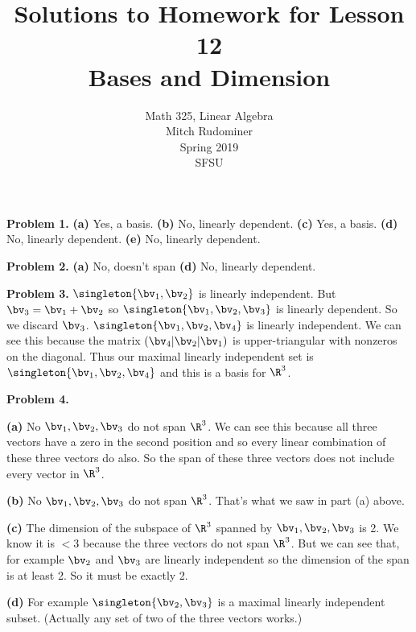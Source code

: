 \documentclass[oneside,12pt]{amsart}
\begin{document}
\title{Solutions to Homework for Lesson 12 \\ Bases and Dimension}
\author{Math 325, Linear Algebra \\ Mitch Rudominer \\ Spring 2019 \\ SFSU }
\date{}

\maketitle


\textbf{Problem 1.}
\textbf{(a)} Yes, a basis.
\textbf{(b)} No, linearly dependent.
\textbf{(c)} Yes, a basis.
\textbf{(d)} No, linearly dependent.
\textbf{(e)} No, linearly dependent.
\bigskip

\textbf{Problem 2.}
\textbf{(a)} No, doesn't span
\textbf{(d)} No, linearly dependent.

\bigskip


\textbf{Problem 3.} $\singleton{\bv_1,\bv_2}$ is linearly independent.
But $\bv_3 = \bv_1+\bv_2$ so $\singleton{\bv_1,\bv_2,\bv_3}$ is linearly
dependent. So we discard $\bv_3$. $\singleton{\bv_1,\bv_2,\bv_4}$ is linearly
independent. We can see this because the matrix
$\left(\bv_4 \vert \bv_2 \vert \bv_1 \right)$ is upper-triangular with
nonzeros on the diagonal. Thus our maximal linearly independent set is
$\singleton{\bv_1,\bv_2,\bv_4}$ and this is a basis for $\R^3$.

\bigskip

\textbf{Problem 4.}

\textbf{(a)} No $\bv_1,\bv_2,\bv_3$ do not span $\R^3$. We can see this because
all three vectors have a zero in the second position and so every linear combination
of these three vectors do also. So the span of these three vectors does not include
every vector in $\R^3$.

\bigskip



\textbf{(b)} No $\bv_1,\bv_2,\bv_3$ do not span $\R^3$. That's what we saw in part (a) above.

\bigskip


\textbf{(c)} The dimension of the subspace of $\R^3$ spanned by $\bv_1,\bv_2,\bv_3$ is 2.
We know it is $<3$ because the three vectors do not span $\R^3$. But we can see that,
for example $\bv_2$ and $\bv_3$ are linearly independent so the dimension of the
span is at least 2. So it must be exactly 2.

\bigskip


\textbf{(d)} For example $\singleton{\bv_2,\bv_3}$ is a maximal linearly independent subset.
(Actually any set of two of the three vectors works.)
\end{document}
